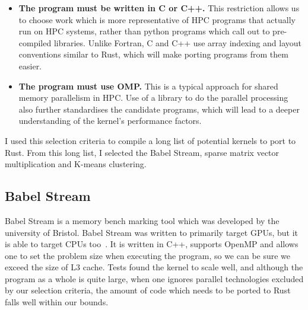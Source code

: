 \begin{itemize}
  \item \textbf{The program must be written in C or C++.} This restriction allows us to choose work which is more representative of HPC programs that actually run on HPC systems, rather than python programs which call out to pre-compiled libraries. Unlike Fortran, C and C++ use array indexing and layout conventions similar to Rust, which will make porting programs from them easier.

  \item \textbf{The program must use OMP.} This is a typical approach for shared memory parallelism in HPC. Use of a library to do the parallel processing also further standardises the candidate programs, which will lead to a deeper understanding of the kernel's performance factors.
\end{itemize}

I used this selection criteria to compile a long list of potential kernels to port to Rust. From this long list, I selected the Babel Stream, sparse matrix vector multiplication and K-means clustering.

\subsection{Babel Stream}

Babel Stream is a memory bench marking tool which was developed by the university of Bristol. Babel Stream was written to primarily target GPUs, but it is able to target CPUs too~\cite{BabelStream}.  It is written in C++, supports OpenMP and allows one to set the problem size when executing the program, so we can be sure we exceed the size of L3 cache. Tests found the kernel to scale well, and although the program as a whole is quite large, when one ignores parallel technologies excluded by our selection criteria, the amount of code which needs to be ported to Rust falls well within our bounds.

